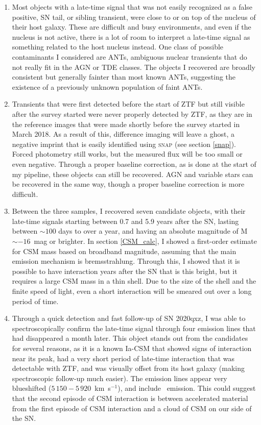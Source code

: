 \documentclass[a4paper,oneside,12pt, class=Latex/Classes/PhDthesisPSnPDF, crop=false]{standalone}
\begin{document}
\begin{enumerate}
	\item Most objects with a late-time signal that was not easily recognized as a false positive, SN tail, or sibling transient, were close to or on top of the nucleus of their host galaxy. These are difficult and busy environments, and even if the nucleus is not active, there is a lot of room to interpret a late-time signal as something related to the host nucleus instead. One class of possible contaminants I considered are ANTs, ambiguous nuclear transients that do not really fit in the AGN or TDE classes. The objects I recovered are broadly consistent but generally fainter than most known ANTs, suggesting the existence of a previously unknown population of faint ANTs.
	\item Transients that were first detected before the start of ZTF but still visible after the survey started were never properly detected by ZTF, as they are in the reference images that were made shortly before the survey started in March 2018. As a result of this, difference imaging will leave a ghost, a negative imprint that is easily identified using \textsc{snap} (see section \ref{snap}). Forced photometry still works, but the measured flux will be too small or even negative. Through a proper baseline correction, as is done at the start of my pipeline, these objects can still be recovered. AGN and variable stars can be recovered in the same way, though a proper baseline correction is more difficult.
	\item Between the three samples, I recovered seven candidate objects, with their late-time signals starting between 0.7 and 5.9 years after the SN, lasting between $\sim100$ days to over a year, and having an absolute magnitude of M~$\sim-16$~mag or brighter. In section \ref{CSM_calc}, I showed a first-order estimate for CSM mass based on broadband magnitude, assuming that the main emission mechanism is bremsstrahlung. Through this, I showed that it is possible to have interaction years after the SN that is this bright, but it requires a large CSM mass in a thin shell. Due to the size of the shell and the finite speed of light, even a short interaction will be smeared out over a long period of time.
	\item Through a quick detection and fast follow-up of SN 2020qxz, I was able to spectroscopically confirm the late-time signal through four emission lines that had disappeared a month later. This object stands out from the candidates for several reasons, as it is a known Ia-CSM that showed signs of interaction near its peak, had a very short period of late-time interaction that was detectable with ZTF, and was visually offset from its host galaxy (making spectroscopic follow-up much easier). The emission lines appear very blueshifted ($5\,150 - 5\,920$~km~s$^{-1}$), and include \Hbeta\ emission. This could suggest that the second episode of CSM interaction is between accelerated material from the first episode of CSM interaction and a cloud of CSM on our side of the SN.

\end{enumerate}
\end{document}

